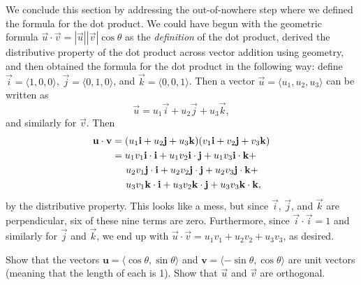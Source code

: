 \documentclass[prettycode,shellescape]{watsonbook}
\begin{document}
We conclude this section by addressing the out-of-nowhere step where
we defined the formula for the dot product. We could have begun with
the geometric formula
$\vec{u} \cdot \vec{v} = |\vec{u}| |\vec{v}| \cos\theta$ as the
\textit{definition} of the dot product, derived the distributive
property of the dot product across vector addition using geometry, and
then obtained the formula for the dot product in the following 
way: define $\vec{i} = \langle1,0,0\rangle$,
$\vec{j} = \langle0,1,0\rangle$, and $\vec{k} =
\langle0,0,1\rangle$. Then a vector
$\vec{u} = \langle u_1, u_2, u_3\rangle$ can be written as
\[
  \vec{u} = u_1 \vec{i} + u_2 \vec{j} + u_3 \vec{k},
\]
and similarly for $\vec{v}$. Then 
\begin{align*}
  \vec{u} \cdot \vec{v} &= (u_1 \vec{i} + u_2 \vec{j} + u_3
                          \vec{k})(v_1 \vec{i} + v_2 \vec{j} + v_3 \vec{k})  \\
                        &= u_1 v_1 \vec{i} \cdot \vec{i} + u_1 v_2 \vec{i} \cdot
                          \vec{j}  + u_1 v_3 \vec{i} \cdot \vec{k}  + \\ 
                        &\hspace{5mm}  u_2 v_1 \vec{j} \cdot \vec{i} + u_2 v_2 \vec{j} \cdot
                          \vec{j}  + u_2 v_3 \vec{j} \cdot \vec{k}  + \\ 
                        &\hspace{5mm}  u_3 v_1 \vec{k} \cdot \vec{i} + u_3 v_2 \vec{k} \cdot
                          \vec{j}  + u_3 v_3 \vec{k} \cdot \vec{k},
\end{align*}
by the distributive property. This looks like a mess, but since
$\vec{i}$,  $\vec{j}$, and  $\vec{k}$ are 
perpendicular, six of these nine terms are zero. Furthermore, since
$\vec{i}\cdot \vec{i} = 1$ and similarly for $\vec{j}$ and
$\vec{k}$, we end up with $  \vec{u} \cdot \vec{v}  = u_1 v_1
+ u_2 v_2 + u_3 v_3$, as desired.

\begin{exercise}{}{}
  Show that the vectors
  $\mathbf{u} = \langle \cos \theta, \sin \theta \rangle$ and
  $\mathbf{v} = \langle -\sin \theta, \cos \theta \rangle$ are unit
  vectors (meaning that the length of each is 1). Show that $\vec{u}$
  and $\vec{v}$ are orthogonal.
\end{exercise}
\end{document}
